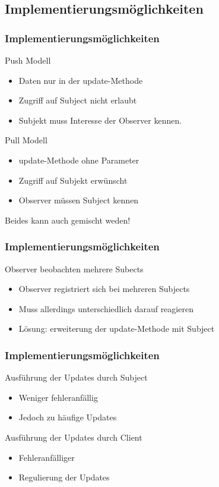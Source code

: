 \subsection{Implementierungsmöglichkeiten}
\begin{frame}
\frametitle{Implementierungsmöglichkeiten}
		\begin{block}{Push Modell}
		  \begin{itemize}
		  	\item Daten nur in der update-Methode
		  	\item Zugriff auf Subject nicht erlaubt
		  	\item Subjekt muss Interesse der Observer kennen.
		  \end{itemize}
  		\end{block}
  		\begin{block}{Pull Modell}
  		 \begin{itemize}
		  	\item update-Methode ohne Parameter
		  	\item Zugriff auf Subjekt erwünscht
		  	\item Observer müssen Subject kennen
		  \end{itemize}  
  		\end{block}
  		Beides kann auch gemischt weden!
\end{frame}


\begin{frame}
\frametitle{Implementierungsmöglichkeiten}
		  \begin{block}{Observer beobachten mehrere Subects}
		  	\begin{itemize}
		  		\item Observer registriert sich bei mehreren Subjects
		  		\item Muss allerdings unterschiedlich darauf reagieren
		  		\item Lösung: erweiterung der update-Methode mit Subject
		  	\end{itemize}
		  \end{block}
\end{frame}

\begin{frame}
\frametitle{Implementierungsmöglichkeiten}
		\begin{block}{Ausführung der Updates durch Subject}
  		 \begin{itemize}
		  	\item Weniger fehleranfällig
		  	\item Jedoch zu häufige Updates
		  \end{itemize}  
  		\end{block}		
  		\begin{block}{Ausführung der Updates durch Client}
		  \begin{itemize}
		  	\item Fehleranfälliger
		  	\item Regulierung der Updates
		  \end{itemize}
  		\end{block}
			
\end{frame}
